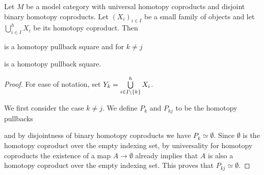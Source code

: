 \begin{corollary}\label{cor:genCoproductComponentPb}
    Let $M$ be a model category with universal homotopy coproducts and disjoint binary homotopy coproducts.
    Let $\left(X_i\right)_{i\in I}$ be a small family of objects and let $\bigcup\limits_{i\in I}^h X_i$ be its homotopy coproduct.
    Then
    \begin{center}
    \end{center}
    is a homotopy pullback square and for $k\neq j$
    \begin{center}
    \end{center}
    is a homotopy pullback square.
    \begin{proof}
        For ease of notation, set $Y_k=\bigcup\limits_{i\in I\setminus{\left\lbrace k\right\rbrace}}^hX_i$.

        We first consider the case $k\neq j$.
        We define $P_k$ and $P_{kj}$ to be the homotopy pullbacks 
        \begin{center}
        \end{center}
        and by disjointness of binary homotopy coproducts we have $P_k\simeq\emptyset$.
        Since $\emptyset$ is the homotopy coproduct over the empty indexing set, by universality for homotopy coproducts the existence of a map $A\to\emptyset$ already implies that $A$ is also a homotopy coproduct over the empty indexing set.
        This proves that $P_{kj}\simeq\emptyset$.


\end{proof}
\end{corollary}
